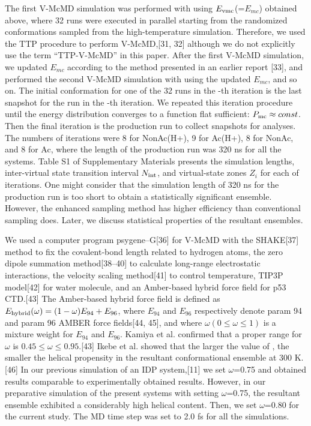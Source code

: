 The first V-McMD simulation was performed with using $E_{\rm vmc}$(=$E_{mc}$) obtained above, where 32 runs were executed in parallel starting from the randomized conformations sampled from the high-temperature simulation. Therefore, we used the TTP procedure to perform V-McMD,[31, 32] although we do not explicitly use the term “TTP-V-McMD” in this paper. After the first V-McMD simulation, we updated $E_{mc}$ according to the method presented in an earlier report [33], and performed the second V-McMD simulation with using the updated $E_{mc}$, and so on. The initial conformation for one of the 32 runs in the -th iteration is the last snapshot for the run in the -th iteration. We repeated this iteration procedure until the energy distribution converges to a function flat sufficient: $P_{\rm mc} \approx const$. Then the final iteration is the production run to collect snapshots for analyses. The numbers of iterations were 8 for NonAc(H+), 9 for Ac(H+), 8 for NonAc, and 8 for Ac, where the length of the production run was 320 ns for all the systems. Table S1 of Supplementary Materials presents the simulation lengths, inter-virtual state transition interval $N_{\rm int}$, and virtual-state zones $Z_i$ for each of iterations. One might consider that the simulation length of 320 ns for the production run is too short to obtain a statistically significant ensemble. However, the enhanced sampling method has higher efficiency than conventional sampling does. Later, we discuss statistical properties of the resultant ensembles.

We used a computer program psygene–G[36] for V-McMD with the SHAKE[37] method to fix the covalent-bond length related to hydrogen atoms, the zero dipole summation method[38–40] to calculate long-range electrostatic interactions, the velocity scaling method[41] to control temperature, TIP3P model[42] for water molecule, and an Amber-based hybrid force field for p53 CTD.[43] The Amber-based hybrid force field is defined as $E_{\rm hybrid}(\omega) = (1-\omega)E_{94}+E_{96}$, where $E_{94}$ and $E_{96}$ respectively denote param 94 and param 96 AMBER force fields[44, 45], and where $\omega (0 \le \omega \le 1)$ is a mixture weight for $E_{94}$ and $E_{96}$. Kamiya et al. confirmed that a proper range for $\omega$ is $0.45 \le \omega \le 0.95$.[43] Ikebe et al. showed that the larger the value of , the smaller the helical propensity in the resultant conformational ensemble at 300 K.[46] In our previous simulation of an IDP system,[11] we set $\omega$=0.75 and obtained results comparable to experimentally obtained results. However, in our preparative simulation of the present systems with setting $\omega$=0.75, the resultant ensemble exhibited a considerably high helical content. Then, we set $\omega$=0.80 for the current study. The MD time step was set to 2.0 fs for all the simulations.

